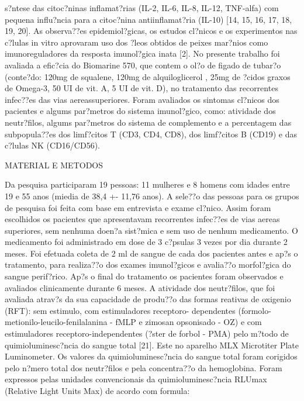 \documentclass[12pt]{article}
\begin{document}
s?ntese das citoc?ninas inflamat?rias (IL-2, IL-6, IL-8, IL-12, TNF-alfa) com
pequena influ?ncia para a citoc?nina antiinflamat?ria (IL-10) [14, 15,
16, 17, 18, 19, 20].
 As observa??es epidemiol?gicas, os estudos cl?nicos e os experimentos
nas c?lulas in vitro aprovaram uso dos ?leos obtidos de peixes mar?nios
como imunoreguladores da resposta imunol?gica inata [2].
 No presente trabalho foi avaliada a efic?cia do Biomarine 570, que
contem o ol?o de figado de tubar?o (conte?do: 120mg de squalene, 120mg de
alquiloglicerol , 25mg de ?cidos graxos de Omega-3, 50 UI de vit. A, 5
UI de vit. D), no tratamento das recorrentes infec??es das vias
aereassuperiores.  Foram avaliados os sintomas cl?nicos dos pacientes e algums
par?metros do sistema imunol?gico, como: atividade dos neutr?filos,
algums par?metros do sistema de complemento e a percentagem das
subpopula??es dos limf?citos T (CD3, CD4, CD8), dos limf?citos B (CD19) e das
c?lulas NK (CD16/CD56).

\begin{center}
\large{MATERIAL E METODOS}
\end{center}

 Da pesquisa participaram 19 pessoas: 11 mulheres e 8 homens com idades
entre 19 e 55 anos (miedia de 38,4 +- 11,76 anos). A sele??o das
pessoas para os grupos de pesquisa foi feita com base em entrevista e exame
cl?nico. Assim foram escolhidos os pacientes que apresentavam
recorrentes infec??es de vias aereas superiores, sem nenhuma doen?a sist?mica e
sem uso de nenhum medicamento. O medicamento foi administrado em dose de
3 c?psulas 3 vezes por dia durante 2 meses. Foi efetuada coleta de 2 ml
de sangue de cada dos pacientes antes e ap?s o tratamento, para
realiza??o dos exames imunol?gicos e avalia??o morfol?gica do sangue
perif?rico. Ap?s o final do tratamento os pacientes foram observados e avaliados
clinicamente durante 6 meses.
 A atividade dos neutr?filos, que  foi avaliada atrav?s da sua
capacidade de produ??o das formas reativas de oxigenio (RFT): sem estimulo, com
estimuladores receptoro- dependentes
(formolo-metionilo-leucilo-fenilalanina - fMLP e zimosan opsonisado - OZ) e com estimuladores
receptoro-independentes (?ster de forbol - PMA) pelo m?todo de quimioluminesc?ncia
do sangue total [21]. Este no aparelho MLX Microtiter Plate
Luminometer. Os valores da quimioluminesc?ncia do sangue total foram corigidos
pelo n?mero total dos neutr?filos e pela concentra??o da hemoglobina.
Foram expressos pelas unidades convencionais da quimioluminesc?ncia RLUmax
(Relative Light Units Max) de acordo com formula:
\end{document}
